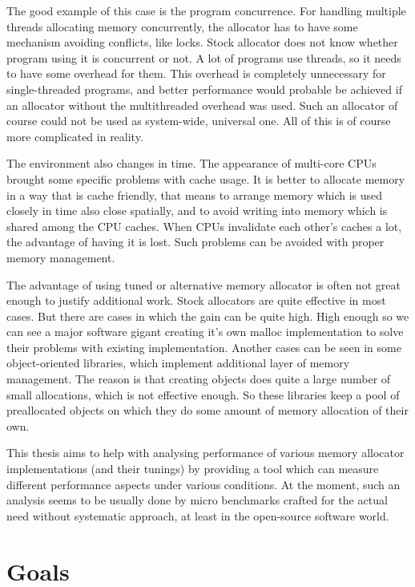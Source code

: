 The good example of this case is the program concurrence. For handling multiple threads allocating memory concurrently, the allocator has to have some mechanism avoiding conflicts, like locks. Stock allocator does not know whether program using it is concurrent or not. A lot of programs use threads, so it needs to have some overhead for them. This overhead is completely unnecessary for single-threaded programs, and better performance would probable be achieved if an allocator without the multithreaded overhead was used. Such an allocator of course could not be used as system-wide, universal one. All of this is of course more complicated in reality.

The environment also changes in time. The appearance of multi-core CPUs brought some specific problems with cache usage. It is better to allocate memory in a way that is cache friendly, that means to arrange memory which is used closely in time also close spatially, and to avoid writing into memory which is shared among the CPU caches. When CPUs invalidate each other's caches a lot, the advantage of having it is lost. Such problems can be avoided with proper memory management.

The advantage of using tuned or alternative memory allocator is often not great enough to justify additional work. Stock allocators are quite effective in most cases. But there are cases in which the gain can be quite high. High enough so we can see a major software gigant creating it's own malloc implementation to solve their problems with existing implementation.\cite{tcmalloc} Another cases can be seen in some object-oriented libraries, which implement additional layer of memory management. The reason is that creating objects does quite a large number of small allocations, which is not effective enough. So these libraries keep a pool of preallocated objects on which they do some amount of memory allocation of their own.\cite{glib-memalloc}

This thesis aims to help with analysing performance of various memory allocator implementations (and their tunings) by providing a tool which can measure different performance aspects under various conditions. At the moment, such an analysis seems to be usually done by micro benchmarks crafted for the actual need without systematic approach, at least in the open-source software world.

\section{Goals}

